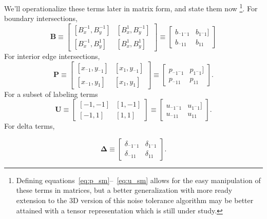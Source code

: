 We'll operationalize these terms later in matrix form, and state them now \footnote{
    Defining equations~\ref{eq:p_sm}--~\ref{eq:u_sm} allows for the easy manipulation
    of these terms in matrices, but a better generalization with more ready extension to
    the 3D version of this noise tolerance algorithm may be better attained with a tensor
    representation which is still under study.
  }.  For boundary intersections,
\begin{equation}
  \mathbf{B} \equiv \begin{bmatrix}
    [B_x^{-1}, B_y^{-1}] & [B_x^{1}, B_y^{-1}] \\
    [B_x^{-1}, B_y^{1}] & [B_x^{1}, B_y^{1}]
    \end{bmatrix} \equiv \begin{bmatrix}
      b_{^-1^-1} & b_{1^-1}] \\
      b_{^-11} & b_{11}
      \end{bmatrix}
\end{equation}
For interior edge intersections,
\begin{equation}
  \mathbf{P} \equiv \begin{bmatrix}
    [x_{^-1}, y_{^-1}] & [x_1, y_{^-1}] \\
    [x_{^-1}, y_1] & [x_1, y_1]
  \end{bmatrix} \equiv \begin{bmatrix}
    p_{^-1^-1} & p_{1^-1}] \\
    p_{^-11} & p_{11}
    \end{bmatrix}.
  \label{eq:P}
\end{equation}
For a subset of labeling terms
\begin{equation}
\mathbf{U} \equiv \begin{bmatrix}
  [-1, -1] & [1, -1] \\
  [-1, 1] & [1, 1]
  \end{bmatrix} \equiv \begin{bmatrix}
    u_{^-1^-1} & u_{1^-1}] \\
    u_{^-11} & u_{11}
    \end{bmatrix}.
  \label{eq:indices}
\end{equation}
For delta terms,

\begin{equation}
  \mathbf{\Delta} \equiv \begin{bmatrix}
    \delta_{^-1^-1} & \delta_{1^-1} \\
    \delta_{^-11} & \delta_{11}
    \end{bmatrix}.
    \label{eq:D}
\end{equation}

